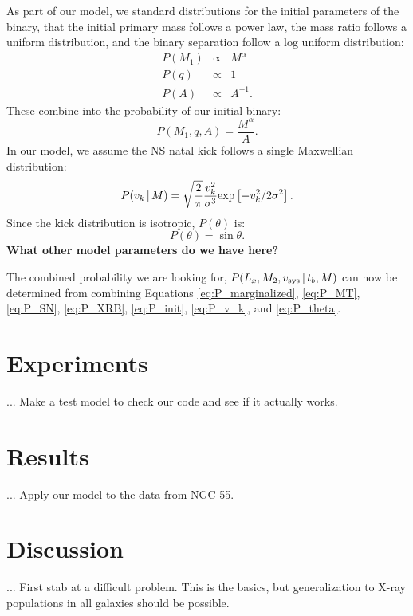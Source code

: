 \documentclass[12pt, preprint]{aastex}
\newcommand{\given}{\,|\,}
\begin{document}
As part of our model, we standard distributions for the initial parameters of the binary, that the initial primary mass follows a power law, the mass ratio follows a uniform distribution, and the binary separation follow a log uniform distribution:
\begin{eqnarray}
P(M_1) &\propto& M^{\alpha} \\
P(q) &\propto& 1 \\
P(A) &\propto& A^{-1}.
\end{eqnarray}
These combine into the probability of our initial binary:
\begin{equation}
P(M_1, q, A) = \frac{M^{\alpha}}{A}. \label{eq:P_init}
\end{equation}
In our model, we assume the NS natal kick follows a single Maxwellian distribution:
\begin{equation}
P(v_k \given M) = \sqrt{\frac{2}{\pi}} \frac{v_k^2} {\sigma^3} {\rm exp} \left[ -v_k^2 / 2 \sigma^2 \right]. \label{eq:P_v_k}
\end{equation}
Since the kick distribution is isotropic, $P(\theta)$ is:
\begin{equation}
P(\theta) = \sin \theta. \label{eq:P_theta}
\end{equation}
{\bf What other model parameters do we have here?}

The combined probability we are looking for, $P(L_x, M_2, v_{\rm sys} \given t_b, M)$ can now be determined from combining Equations \ref{eq:P_marginalized}, \ref{eq:P_MT}, \ref{eq:P_SN}, \ref{eq:P_XRB}, \ref{eq:P_init}, \ref{eq:P_v_k}, and \ref{eq:P_theta}.



\section{Experiments}

... Make a test model to check our code and see if it actually works.

\section{Results}

... Apply our model to the data from NGC 55. 

\section{Discussion}

... First stab at a difficult problem. This is the basics, but generalization to X-ray populations in all galaxies should be possible.
\end{document}
